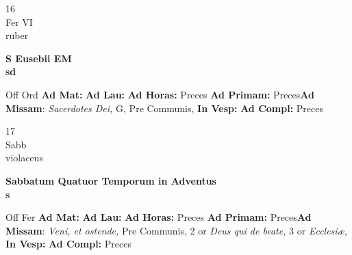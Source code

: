 \documentclass[10pt, openany]{book}
\begin{document}
    \begin{center}
        \begin{minipage}{3.5in}
            \vspace{2em}
            \begin{minipage}{0.5in}
                {\Huge 16} \\
                {\normalsize Fer VI} \\
                {\normalsize ruber}
            \end{minipage}
            \begin{minipage}{3.0in}
                \textbf{ \large S Eusebii EM \\
                \textnormal{\normalsize sd}} \\ 
            \end{minipage}
            \begin{justify}Off Ord
                \textbf{Ad Mat: }
                \textbf{Ad Lau: }
                \textbf{Ad Horas: }Preces
                \textbf{Ad Primam: }Preces\textbf{Ad Missam}: \textit{Sacerdotes Dei,} G, Pre Communis,  
                \textbf{In Vesp: }
                \textbf{Ad Compl: }Preces
            \end{justify}
        \end{minipage}
    \end{center}

    \begin{center}
        \begin{minipage}{3.5in}
            \vspace{2em}
            \begin{minipage}{0.5in}
                {\Huge 17} \\
                {\normalsize Sabb} \\
                {\normalsize violaceus}
            \end{minipage}
            \begin{minipage}{3.0in}
                \textbf{ \large Sabbatum Quatuor Temporum in Adventus \\
                \textnormal{\normalsize s}} \\ 
            \end{minipage}
            \begin{justify}Off Fer
                \textbf{Ad Mat: }
                \textbf{Ad Lau: }
                \textbf{Ad Horas: }Preces
                \textbf{Ad Primam: }Preces\textbf{Ad Missam}: \textit{Veni, et ostende,} Pre Communis, 2 or \textit{Deus qui de beate,} 3 or \textit{Ecclesiæ,}  
                \textbf{In Vesp: }
                \textbf{Ad Compl: }Preces
            \end{justify}
        \end{minipage}
    \end{center}
\end{document}
